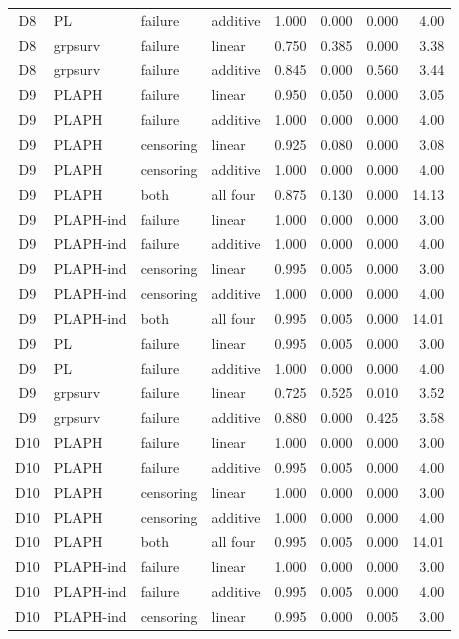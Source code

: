 \begin{longtable}{clllrrrr}
D8 & PL & failure & additive & 1.000 & 0.000 & 0.000 & 4.00 \\
D8 & grpsurv & failure & linear & 0.750 & 0.385 & 0.000 & 3.38 \\
D8 & grpsurv & failure & additive & 0.845 & 0.000 & 0.560 & 3.44 \\
D9 & PLAPH & failure & linear & 0.950 & 0.050 & 0.000 & 3.05 \\
D9 & PLAPH & failure & additive & 1.000 & 0.000 & 0.000 & 4.00 \\
D9 & PLAPH & censoring & linear & 0.925 & 0.080 & 0.000 & 3.08 \\
D9 & PLAPH & censoring & additive & 1.000 & 0.000 & 0.000 & 4.00 \\
D9 & PLAPH & both & all four & 0.875 & 0.130 & 0.000 & 14.13 \\
D9 & PLAPH-ind & failure & linear & 1.000 & 0.000 & 0.000 & 3.00 \\
D9 & PLAPH-ind & failure & additive & 1.000 & 0.000 & 0.000 & 4.00 \\
D9 & PLAPH-ind & censoring & linear & 0.995 & 0.005 & 0.000 & 3.00 \\
D9 & PLAPH-ind & censoring & additive & 1.000 & 0.000 & 0.000 & 4.00 \\
D9 & PLAPH-ind & both & all four & 0.995 & 0.005 & 0.000 & 14.01 \\
D9 & PL & failure & linear & 0.995 & 0.005 & 0.000 & 3.00 \\
D9 & PL & failure & additive & 1.000 & 0.000 & 0.000 & 4.00 \\
D9 & grpsurv & failure & linear & 0.725 & 0.525 & 0.010 & 3.52 \\
D9 & grpsurv & failure & additive & 0.880 & 0.000 & 0.425 & 3.58 \\
D10 & PLAPH & failure & linear & 1.000 & 0.000 & 0.000 & 3.00 \\
D10 & PLAPH & failure & additive & 0.995 & 0.005 & 0.000 & 4.00 \\
D10 & PLAPH & censoring & linear & 1.000 & 0.000 & 0.000 & 3.00 \\
D10 & PLAPH & censoring & additive & 1.000 & 0.000 & 0.000 & 4.00 \\
D10 & PLAPH & both & all four & 0.995 & 0.005 & 0.000 & 14.01 \\
D10 & PLAPH-ind & failure & linear & 1.000 & 0.000 & 0.000 & 3.00 \\
D10 & PLAPH-ind & failure & additive & 0.995 & 0.005 & 0.000 & 4.00 \\
D10 & PLAPH-ind & censoring & linear & 0.995 & 0.000 & 0.005 & 3.00 \\

\end{longtable}
